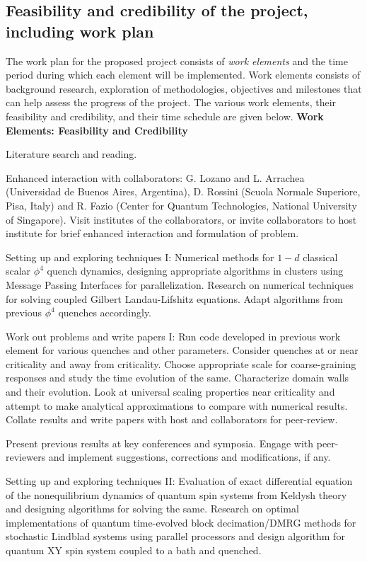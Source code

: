 \documentclass[a4paper,11pt,color]{article}
\begin{document}
\subsection{Feasibility and credibility of the project, including work
  plan}
\label{sec:feasibility}
The work plan for the proposed project consists of \textit{work elements} and the time period during which each element will be implemented. Work elements consists of background research, exploration of methodologies, objectives and milestones that can help assess the progress of the project. The various work elements, their feasibility and credibility, and their time schedule are given below.
\newpage
\textbf{Work Elements: Feasibility and Credibility}
\begin{enumerate}{
\item
Literature search and reading.
\item
Enhanced interaction with collaborators: G. Lozano and L. Arrachea (Universidad de Buenos Aires, Argentina), D. Rossini (Scuola Normale Superiore, Pisa, Italy) and R. Fazio (Center for Quantum Technologies, National University of Singapore). Visit institutes of the collaborators, or invite collaborators to host institute for brief enhanced interaction and formulation of problem.
\item
Setting up and exploring techniques I: Numerical methods for $1-d$ classical scalar $\phi^4$ quench dynamics, designing appropriate algorithms in clusters using Message Passing Interfaces for parallelization. Research on numerical techniques for solving coupled Gilbert Landau-Lifshitz equations. Adapt algorithms from previous $\phi^4$ quenches  accordingly.
\item
Work out problems and write papers I: Run code developed in previous work element for various quenches and other parameters. Consider quenches at or near criticality and away from criticality. Choose appropriate scale for coarse-graining responses and study the time evolution of the same. Characterize domain walls and their evolution. Look at universal scaling properties near criticality and attempt to make analytical approximations to compare with numerical results. Collate results and write papers with host and collaborators for peer-review.
\item
Present previous results at key conferences and symposia. Engage with peer-reviewers and implement suggestions, corrections and modifications, if any.
\item
Setting up and exploring techniques II: Evaluation of exact differential equation of the nonequilibrium dynamics of quantum spin systems from Keldysh theory and designing algorithms for solving the same. Research on optimal implementations of quantum time-evolved block decimation/DMRG methods for stochastic Lindblad systems using parallel processors and design algorithm for quantum XY spin system coupled to a bath and quenched.
}
\end{enumerate}
\end{document}
